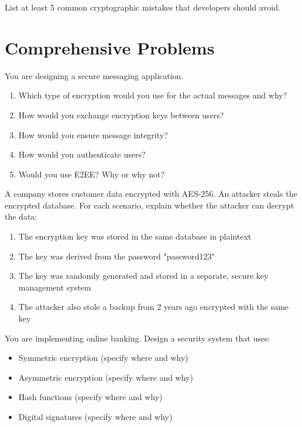 \documentclass[11pt,a4paper]{report}
\begin{document}
\begin{ex}
List at least 5 common cryptographic mistakes that developers should avoid.
\end{ex}

\section{Comprehensive Problems}

\begin{ex}
You are designing a secure messaging application.

\begin{enumerate}[label=\alph*)]
    \item Which type of encryption would you use for the actual messages and why?
    \item How would you exchange encryption keys between users?
    \item How would you ensure message integrity?
    \item How would you authenticate users?
    \item Would you use E2EE? Why or why not?
\end{enumerate}
\end{ex}

\begin{ex}
A company stores customer data encrypted with AES-256. An attacker steals the encrypted database. For each scenario, explain whether the attacker can decrypt the data:

\begin{enumerate}[label=\alph*)]
    \item The encryption key was stored in the same database in plaintext
    \item The key was derived from the password "password123"
    \item The key was randomly generated and stored in a separate, secure key management system
    \item The attacker also stole a backup from 2 years ago encrypted with the same key
\end{enumerate}
\end{ex}

\begin{ex}
You are implementing online banking. Design a security system that uses:
\begin{itemize}
    \item Symmetric encryption (specify where and why)
    \item Asymmetric encryption (specify where and why)
    \item Hash functions (specify where and why)
    \item Digital signatures (specify where and why)
\end{itemize}
\end{ex}
\end{document}
